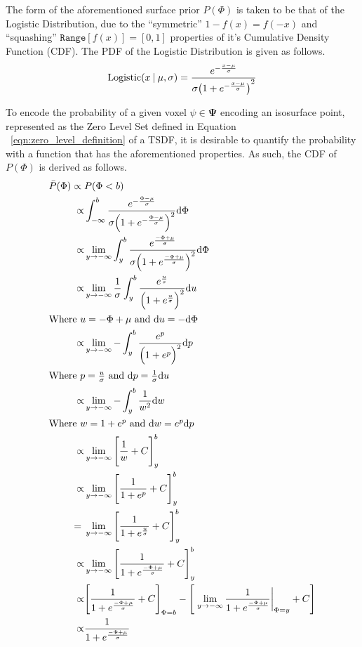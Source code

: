 The form of the aforementioned surface prior \(P(\Phi)\) is taken to be that of
the Logistic Distribution, due to the ``symmetric'' \(1 - f(x) = f(-x)\)
and ``squashing'' \(\texttt{Range}[f(x)] = [0, 1]\) properties of it's Cumulative
Density Function (CDF). The PDF of the Logistic Distribution is given as follows.
\begin{equation}
  \label{eqn:probobj_logistic_dist}
  \text{Logistic}(x \:\vert\: \mu, \sigma) = \frac
  {e^{-\frac{x - \mu}{\sigma}}}
  {\sigma {\big( 1 + e^{-\frac{x - \mu}{\sigma}} \big)}^{2}}
\end{equation}

To encode the probability of a given voxel \(\psi \in \bm{\Psi}\) encoding an
isosurface point, represented as the Zero Level Set defined in Equation
~\ref{eqn:zero_level_definition} of a TSDF, it is desirable to quantify the
probability with a function that has the aforementioned properties. As such, the
CDF of \(P(\Phi)\) is derived as follows.
\begin{align}
  \label{eqn:probobj_surface_prior_cdf}
  \bar{P}(\Phi) \propto{}& P(\Phi < b)\\
  \propto& \int_{-\infty}^{b} \frac
  {e^{-\frac{\Phi - \mu}{\sigma}}}
  {\sigma {\Big( 1 + e^{-\frac{\Phi - \mu}{\sigma}} \Big)}^{2}} {\mathrm d{\Phi}}\\
  \propto& \lim_{y\to -\infty} \int_{y}^{b} \frac
  {e^{\frac{-\Phi + \mu}{\sigma}}}
  {\sigma {\Big( 1 + e^{\frac{-\Phi + \mu}{\sigma}} \Big)}^{2}} {\mathrm d{\Phi}}\\
  \propto& \lim_{y\to -\infty} \frac{1}{\sigma} \int_{y}^{b}
  \frac{e^{\frac{u}{s}}}{{\Big( 1 + e^{\frac{u}{\sigma}} \Big)}^{2}} {\mathrm d{u}}\\
  \shortintertext{Where \( u = -\Phi + \mu \) and \({\mathrm d{u}} = -{\mathrm d{\Phi}}\)}
  \propto& \lim_{y\to -\infty} -\int_{y}^{b}
  \frac{e^{p}}{{\Big( 1 + e^{p} \Big)}^{2}} {\mathrm d{p}}\\
  \shortintertext{Where \(p = \frac{u}{\sigma}\) and \({\mathrm d{p}} = \frac{1}{\sigma} {\mathrm d{u}}\)}
  \propto& \lim_{y\to -\infty} -\int_{y}^{b} \frac{1}{w^{2}} {\mathrm d{w}}\\
  \shortintertext{Where \(w = 1 + e^{p}\) and \({\mathrm d{w}} = e^{p} {\mathrm d{p}}\)}
  \propto& \lim_{y\to -\infty} {\Bigg[ \frac{1}{w} + C \Bigg]}_{y}^{b}\\
  \propto& \lim_{y\to -\infty} {\Bigg[ \frac{1}{1 + e^{p}} + C \Bigg]}_{y}^{b}\\
  ={}& \lim_{y\to -\infty} {\Bigg[ \frac{1}{1 +e^{\frac{u}{\sigma}}} + C
  \Bigg]}_{y}^{b}\\
  \propto& \lim_{y\to -\infty} {\Bigg[ \frac{1}{1 + e^{\frac{-\Phi + \mu}{\sigma}}} +
  C \Bigg]}_{y}^{b}\\
  \propto& {\Bigg[ \frac{1}{1 + e^{\frac{-\Phi + \mu}{\sigma}}} + C \Bigg]}_{\Phi = b}
  - \Bigg[ \left. \lim_{y\to -\infty} \frac{1}{1 + e^{\frac{-\Phi + \mu}{\sigma}}}
  \right\rvert_{\Phi = y} + C \Bigg]\\
  \propto& \frac{1}{1 + e^{\frac{-\Phi + \mu}{\sigma}}}
\end{align}
